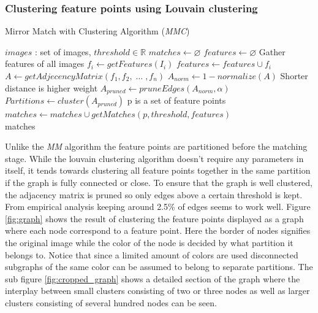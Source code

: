 \documentclass{article}
\begin{document}
\subsubsection{Clustering feature points using Louvain clustering}

\begin{algorithm}
\caption{Mirror Match with Clustering Algorithm (\emph{MMC})}
\label{alg-mmc}
\begin{algorithmic}
\Require $images$ : set of images, $threshold \in \mathbb{R}$
\State $matches\gets \varnothing$
\State $features\gets \varnothing$
 \Comment Gather features of all images
	\State $f_i\gets getFeatures(I_i)$
	\State $features\gets features \cup f_i$
\EndFor
\State $A\gets getAdjecencyMatrix(f_1, f_2,\; \ldots \;, f_n)$
\State $A_{norm}\gets 1 - normalize(A)$
\Comment Shorter distance is higher weight
\State $A_{pruned}\gets pruneEdges(A_{norm},\alpha)$
\State $Partitions\gets cluster(A_{pruned})$
 \Comment p is a set of feature points
	\State $matches\gets matches \cup getMatches(p, threshold, 
features)$
\EndFor \\
\Return matches
\end{algorithmic}
\end{algorithm}

Unlike the \emph{MM} algorithm the feature points are partitioned before 
the matching stage. While the louvain clustering algorithm doesn't 
require any parameters in itself, it tends towards clustering all 
feature points together in the same partition if the graph is fully 
connected or close. To ensure that the graph is well clustered, the 
adjacency matrix is pruned so only edges above a certain threshold is 
kept. From empirical analysis keeping around 2.5\% of edges seems to 
work well. Figure \ref{fig:graph} shows the result of clustering the 
feature points displayed as a graph where each node correspond to a 
feature point. Here the border of nodes signifies the original image 
while the color of the node is decided by what partition it belongs to.  
Notice that since a limited amount of colors are used disconnected 
subgraphs of the same color can be assumed to belong to separate 
partitions. The sub figure \ref{fig:cropped_graph} shows a detailed 
section of the graph where the interplay between small clusters 
consisting of two or three nodes as well as larger clusters consisting 
of several hundred nodes can be seen.
\end{document}
